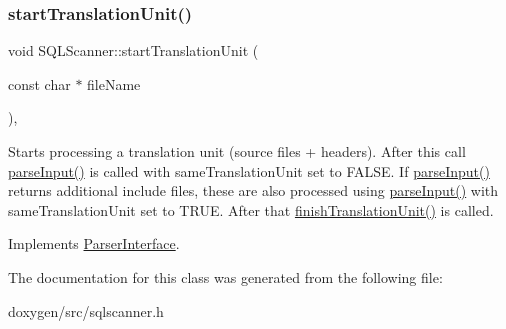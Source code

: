 \mbox{\label{class_s_q_l_scanner_acc0fa16e000516b6e36e563bb2fd9b18}} 
\subsubsection{\texorpdfstring{startTranslationUnit()}{startTranslationUnit()}}
{\footnotesize\ttfamily void S\+Q\+L\+Scanner\+::start\+Translation\+Unit (\begin{DoxyParamCaption}\item[{const char $\ast$}]{file\+Name }\end{DoxyParamCaption})\hspace{0.3cm}{\ttfamily [inline]}, {\ttfamily [virtual]}}

Starts processing a translation unit (source files + headers). After this call \mbox{\hyperlink{class_s_q_l_scanner_ace5de45254ddb10a6282bf626aea6994}{parse\+Input()}} is called with same\+Translation\+Unit set to F\+A\+L\+SE. If \mbox{\hyperlink{class_s_q_l_scanner_ace5de45254ddb10a6282bf626aea6994}{parse\+Input()}} returns additional include files, these are also processed using \mbox{\hyperlink{class_s_q_l_scanner_ace5de45254ddb10a6282bf626aea6994}{parse\+Input()}} with same\+Translation\+Unit set to T\+R\+UE. After that \mbox{\hyperlink{class_s_q_l_scanner_a523d522ed6726915191b5a5ae9584c92}{finish\+Translation\+Unit()}} is called. 

Implements \mbox{\hyperlink{class_parser_interface_a72478f87ead5fde10d7d6bbe32a73024}{Parser\+Interface}}.



The documentation for this class was generated from the following file\+:\begin{DoxyCompactItemize}
\item 
doxygen/src/sqlscanner.\+h\end{DoxyCompactItemize}
